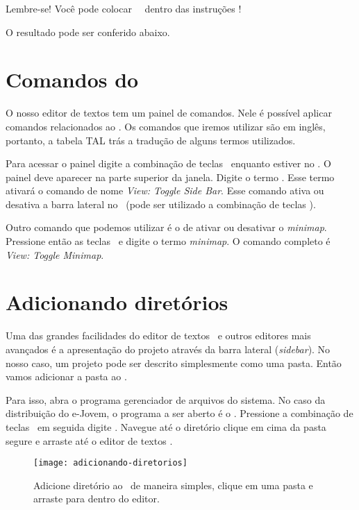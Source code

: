 

Lembre-se! Você pode colocar \tags~\html~dentro das instruções \php!

O resultado pode ser conferido abaixo.


\section{Comandos do \sublime}
\label{comandos-do-sublime}

O nosso editor de textos tem um painel de comandos. Nele é possível aplicar comandos
relacionados ao \sublime. Os comandos que iremos utilizar são em inglês, portanto,
a tabela TAL trás a tradução de alguns termos utilizados.

Para acessar o painel digite a combinação de teclas \ctrlshiftp~enquanto estiver
no \sublime. O painel deve aparecer na parte superior da janela. Digite o termo
\sidebar. Esse termo ativará o comando de nome \textit{View: Toggle Side Bar}.
Esse comando ativa ou desativa a barra lateral no \sublime~(pode ser utilizado
a combinação de teclas \sublimesidebar). 

Outro comando que podemos utilizar é o de ativar ou desativar o \textit{minimap}. 
Pressione então as teclas \ctrlshiftp~e digite o termo \textit{minimap}. 
O comando completo é \textit{View: Toggle Minimap}.

\section{Adicionando diretórios}
\label{adicionando-diretorios}

Uma das grandes facilidades do editor de textos \sublime~e outros editores mais
avançados é a apresentação do projeto através da barra lateral (\textit{sidebar}).
No nosso caso, um projeto pode ser descrito simplesmente como uma pasta. Então
vamos adicionar a pasta  ao \sublime. 

Para isso, abra o programa gerenciador de arquivos do sistema. No caso da 
distribuição do e-Jovem, o programa a ser aberto é o \thunar. Pressione a 
combinação de teclas \altfdois~em seguida digite \thunar. Navegue até o 
diretório  clique em cima da pasta  
segure e arraste até o editor de textos \sublime.

\begin{figure}[H]
  \begin{center}
    \texttt{[image: adicionando-diretorios]}
    \caption{Adicione diretório ao \sublime~de maneira
simples, clique em uma pasta e arraste para dentro do editor.}
    \label{fig:adicionando-diretorios}
  \end{center}
\end{figure}

